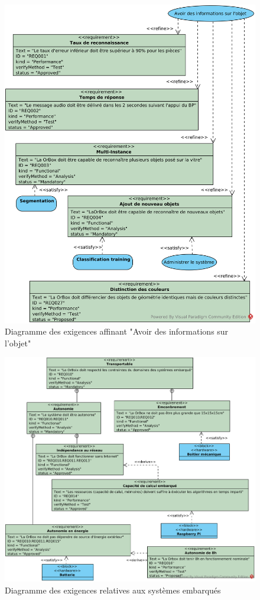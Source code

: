 \begin{figure}[H]
    \centering
    \includegraphics[scale=0.75]{img/SysML_Nominal_RD.png}
    \caption{Diagramme des exigences affinant "Avoir des informations sur l'objet"}
    \label{RDNominal}
\end{figure}

\begin{figure}[H]
    \centering
    \includegraphics[scale=0.75]{img/SysML_Embedded_RD.png}
    \caption{Diagramme des exigences relatives aux systèmes embarqués}
    \label{RDEmbedded}
\end{figure}
		
